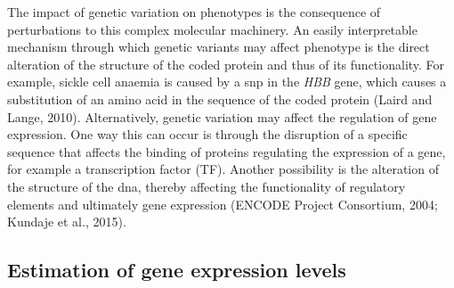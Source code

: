 The impact of genetic variation on phenotypes is the consequence of perturbations to this complex molecular machinery.
An easily interpretable mechanism through which genetic variants may affect phenotype is the direct alteration of the structure of the coded protein and thus of its functionality. 
For example, sickle cell anaemia is caused by a \gls{snp} in the \textit{HBB} gene, which causes a substitution of an amino acid in the sequence of the coded protein (Laird and Lange, 2010). 
Alternatively, genetic variation may affect the regulation of gene expression. 
One way this can occur is through the disruption of a specific sequence that affects the binding of proteins regulating the expression of a gene, for example a transcription factor (TF). 
Another possibility is the alteration of the structure of the \gls{dna}, thereby affecting the functionality of regulatory elements and ultimately gene expression (ENCODE Project Consortium, 2004; Kundaje et al., 2015). 

\subsection{Estimation of gene expression levels}



